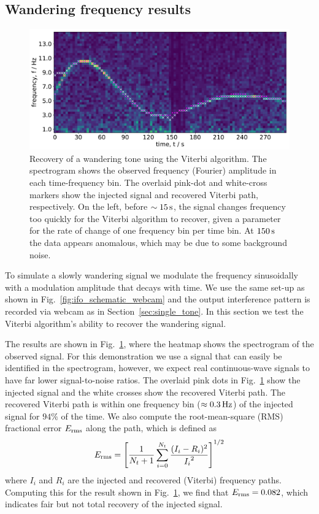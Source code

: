 \documentclass[paper-main.tex]{subfiles}
\begin{document}
\subsection{Wandering frequency results}
\label{sec:wanderingResults}

\begin{figure}
	\includegraphics[width=\textwidth]{figures/expt_overlay_2_viterbi_test_webcam.pdf}
	\caption{\label{fig:viterbi_overlay}
Recovery of a wandering tone using the Viterbi algorithm. 
The spectrogram shows the observed frequency (Fourier) amplitude in each time-frequency bin. 
The overlaid pink-dot and white-cross markers show the injected signal and recovered Viterbi path, respectively. 
On the left, before $\sim 15\,{\rm s}$, the signal changes frequency too quickly for the Viterbi algorithm to recover, given a parameter for the rate of change of one frequency bin per time bin. 
At $150\,{\rm s}$ the data appears anomalous, which may be due to some background noise. }
\end{figure}
 

To simulate a slowly wandering signal we modulate the frequency sinusoidally with a modulation amplitude that decays with time. 
We use the same set-up as shown in Fig.~\ref{fig:ifo_schematic_webcam} and the output interference pattern is recorded via webcam as in Section~\ref{sec:single_tone}. 
In this section we test the Viterbi algorithm’s ability to recover the wandering signal.



The results are shown in Fig.~\ref{fig:viterbi_overlay}, where the heatmap shows the spectrogram of the observed signal. 
For this demonstration we use a signal that can easily be identified in the spectrogram, however, we expect real continuous-wave signals to have far lower signal-to-noise ratios. 
The overlaid pink dots in Fig.~\ref{fig:viterbi_overlay} show the injected signal and the white crosses show the recovered Viterbi path.
The recovered Viterbi path is within one frequency bin ($\approx 0.3\,{\rm Hz}$) of the injected signal for $94\%$ of the time. We also compute the root-mean-square (RMS) fractional error $E_{\rm rms}$ along the path, which is defined as 
\begin{equation}
E_{\rm rms} = \left[ \frac{1}{N_t+1} \sum_{i=0}^{N_t} \frac{(I_i - R_i)^2}{{I_i}^2} \right] ^{1/2}
\end{equation}
where $I_i$ and $R_i$ are the injected and recovered (Viterbi) frequency paths. Computing this for the result shown in Fig.~\ref{fig:viterbi_overlay}, we find that $E_{\rm rms} = 0.082$, which indicates fair but not total recovery of the injected signal.
\end{document}
